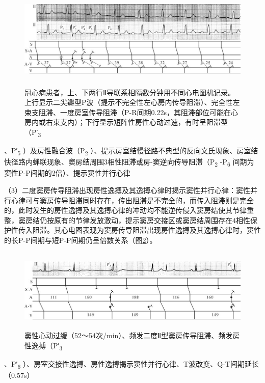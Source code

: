 \begin{figure}[!htbp]
 \centering
 \includegraphics[width=5.91667in,height=1.89583in]{./images/Image00575.jpg}
 \captionsetup{justification=centering}
 \caption{冠心病患者，上、下两行Ⅱ导联系相隔数分钟用不同心电图机记录。上行显示二尖瓣型P波（提示不完全性左心房内传导阻滞）、完全性左束支阻滞、一度房室传导阻滞（P-R间期0.22s，其阻滞部位可能在心房内或右束支内）；下行显示短阵性房性心动过速，有时呈阻滞型（P′\textsubscript{3}}
 \label{fig36-3}
  \end{figure} 
、P′\textsubscript{5} ）及房性融合波（P\textsubscript{2}
）、提示房室结慢径路不典型的反向文氏现象、房室结快径路内蝉联现象、窦房结周围3相性阻滞或房-窦逆向传导阻滞（P\textsubscript{2}
-P\textsubscript{6} 间期为窦性P-P间期的2倍）、提示窦性并行心律

（3）二度窦房传导阻滞出现房性逸搏及其逸搏心律时揭示窦性并行心律：窦性并行心律可与窦房传导阻滞同时存在，传出阻滞是不完全的，而传入阻滞则是完全的，此时发生的房性逸搏及其逸搏心律的冲动均不能逆传侵入窦房结使其节律重整，窦房结仍按原有的节律发放激动，提示窦房交接区或窦房结周围存在4相性保护性传入阻滞。其心电图表现为窦房传导阻滞出现房性逸搏及其逸搏心律时，窦性的长P-P间期与短P-P间期仍呈倍数关系（图\ref{fig36-4}）。

\begin{figure}[!htbp]
 \centering
 \includegraphics[width=5.79167in,height=1.55208in]{./images/Image00576.jpg}
 \captionsetup{justification=centering}
 \caption{窦性心动过缓（52～54次/min）、频发二度Ⅱ型窦房传导阻滞、频发房性逸搏（P′\textsubscript{3}}
 \label{fig36-4}
  \end{figure} 
、P′\textsubscript{6}
）、房室交接性逸搏、房性逸搏揭示窦性并行心律、T波改变、Q-T间期延长（0.57s）

